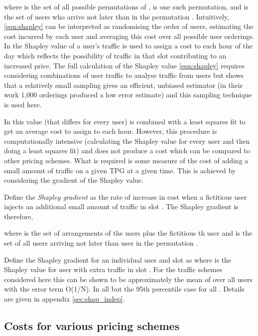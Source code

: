 where  is the set of all  possible permutations of ,
 is one such permutation, and  is the set of users who 
arrive not later than  in the permutation . 
Intuitively, \eqref{eqn:shapley} can be interpreted as randomising the order of users,
estimating the cost incurred by each user  and averaging this cost over all possible 
user orderings. 
In \cite{stanojevic2010heavy} the Shapley value of a user's traffic
is used to assign a cost to each hour of the day which reflects the possibility
of traffic in that slot contributing to an increased price.
The full calculation of the Shapley
value \eqref{eqn:shapley} requires considering  combinations
of user traffic to analyse traffic from  users but
\cite{stanojevic2010heavy} shows that a relatively 
small sampling gives
an efficient, unbiased estimator (in their work 1,000 orderings produced
a low error estimate) and this sampling technique is used here.

In \cite{stanojevic2010heavy} this value (that differs for every user)
is combined with a least squares fit to get an average cost to assign
to each hour.  However, this procedure is computationally intensive 
(calculating the Shapley value for every user and then doing a least
squares fit) and does not produce a cost which can be compared 
to other pricing schemes.
What is required is some measure of the cost of adding a small amount
of traffic on a given TPG at a given time.  This is achieved by
considering the gradient of the Shapley value.

Define the \emph{Shapley gradient} as the rate of
increase in cost when a fictitious user 
injects an additional small amount of traffic  in slot .  
The Shapley gradient is therefore,  

where 
 is the set of arrangements of the
users  plus the fictitious th user and 
 is the set of all users arriving
not later than user  in the permutation .

Define the Shapley gradient for an individual user  and
slot  as 
 where
 is the Shapley value for user  with
extra traffic  in slot . For the traffic schemes considered
here this can be shown to be approximately
the mean of  over all users  with 
the error term O(1/N).  In
all but the 95th percentile case  for all
.  Details are given in appendix \ref{sec:shap_indep}.

\subsection{Costs for various pricing schemes}


